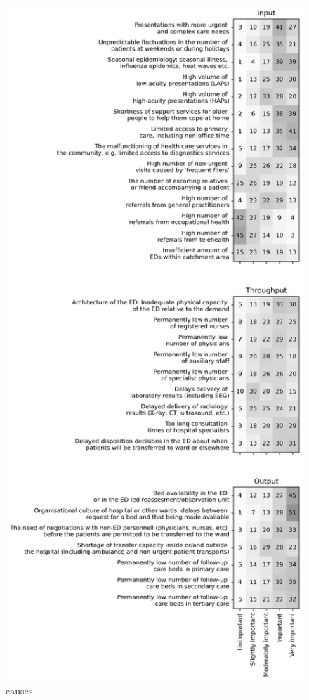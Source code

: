 \documentclass{article}
\begin{document}
\begin{figure}[p]
    \centering
        \includegraphics[height=1.0\textheight]{../output/plots/causes}
        \caption{causes}
        \label{fig:causes}
\end{figure}
\end{document}
